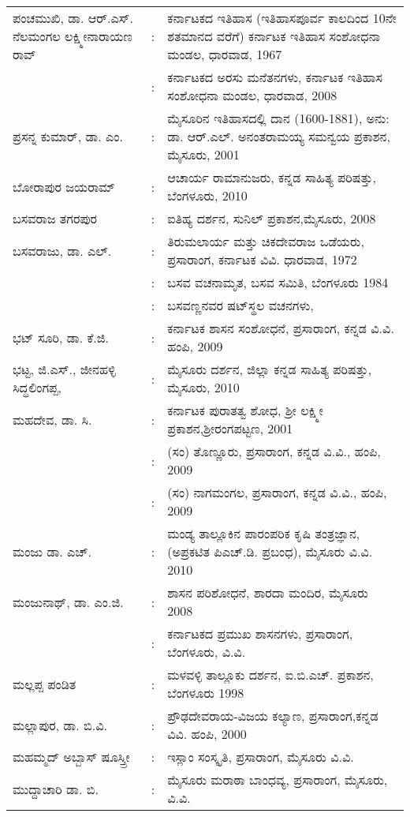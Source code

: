 \begin{longtable}[l]{@{}>{\raggedright}p{4.7cm}cp{9.2cm}<{\raggedright}@{}}
ಪಂಚಮುಖಿ, ಡಾ. ಆರ್​.ಎಸ್​. ನೆಲಮಂಗಲ ಲಕ್ಷ್ಮೀನಾರಾಯಣ ರಾವ್​ & : &  ಕರ್ನಾಟಕದ ಇತಿಹಾಸ (ಇತಿಹಾಸಪೂರ್ವ ಕಾಲದಿಂದ 10ನೇ ಶತಮಾನದ ವರೆಗೆ) ಕರ್ನಾಟಕ ಇತಿಹಾಸ ಸಂಶೋಧನಾ ಮಂಡಲ, ಧಾರವಾಡ, 1967\\[-14pt]
& : & ಕರ್ನಾಟಕದ ಅರಸು ಮನೆತನಗಳು, ಕರ್ನಾಟಕ ಇತಿಹಾಸ ಸಂಶೋಧನಾ ಮಂಡಲ,  ಧಾರವಾಡ, 2008\\
ಪ್ರಸನ್ನ ಕುಮಾರ್​, ಡಾ. ಎಂ. & : &  ಮೈಸೂರಿನ ಇತಿಹಾಸದಲ್ಲಿ ದಾನ (1600-1881), ಅನು: ಡಾ. ಆರ್​.ಎಲ್​. ಅನಂತರಾಮಯ್ಯ ಸಮನ್ವಯ ಪ್ರಕಾಶನ, ಮೈಸೂರು, 2001\\
ಬೋರಾಪುರ ಜಯರಾಮ್ & : &  ಆಚಾರ್ಯ ರಾಮಾನುಜರು, ಕನ್ನಡ ಸಾಹಿತ್ಯ ಪರಿಷತ್ತು, ಬೆಂಗಳೂರು, 2010\\
ಬಸವರಾಜ ತಗರಪುರ & : & ಐತಿಹ್ಯ ದರ್ಶನ, ಸುನಿಲ್​ ಪ್ರಕಾಶನ,ಮೈಸೂರು, 2008\\
ಬಸವರಾಜು, ಡಾ. ಎಲ್​. & : & ತಿರುಮಲಾರ್ಯ ಮತ್ತು ಚಿಕದೇವರಾಜ ಒಡೆಯರು, ಪ್ರಸಾರಾಂಗ, ಕರ್ನಾಟಕ ವಿವಿ. ಧಾರವಾಡ, 1972\\
& : & ಬಸವ ವಚನಾಮೃತ, ಬಸವ ಸಮಿತಿ, ಬೆಂಗಳೂರು 1984\\
& : & ಬಸವಣ್ಣನವರ ಷಟ್​ಸ್ಥಲ ವಚನಗಳು,\\
ಭಟ್​ ಸೂರಿ, ಡಾ. ಕೆ.ಜಿ. & : & ಕರ್ನಾಟಕ ಶಾಸನ ಸಂಶೋಧನೆ, ಪ್ರಸಾರಾಂಗ, ಕನ್ನಡ ವಿ.ವಿ. ಹಂಪಿ, 2009\\
ಭಟ್ಟ, ಜಿ.ಎಸ್​., ಜೀನಹಳ್ಳಿ ಸಿದ್ಧಲಿಂಗಪ್ಪ, & : & ಮೈಸೂರು ದರ್ಶನ, ಜಿಲ್ಲಾ ಕನ್ನಡ ಸಾಹಿತ್ಯ ಪರಿಷತ್ತು, ಮೈಸೂರು, 2010\\
ಮಹದೇವ, ಡಾ. ಸಿ. & : &  ಕರ್ನಾಟಕ ಪುರಾತತ್ವ ಶೋಧ, ಶ‍್ರೀ ಲಕ್ಷ್ಮೀ ಪ್ರಕಾಶನ,\newline ಶ‍್ರೀರಂಗಪಟ್ಟಣ, 2001\\
& : &  (ಸಂ) ತೊಣ್ಣೂರು, ಪ್ರಸಾರಾಂಗ, ಕನ್ನಡ ವಿ.ವಿ., ಹಂಪಿ, 2009\\
& : & (ಸಂ) ನಾಗಮಂಗಲ, ಪ್ರಸಾರಾಂಗ, ಕನ್ನಡ ವಿ.ವಿ., ಹಂಪಿ, 2009\\
ಮಂಜು ಡಾ. ಎಚ್​. & : & ಮಂಡ್ಯ ತಾಲ್ಲೂಕಿನ ಪಾರಂಪರಿಕ ಕೃಷಿ ತಂತ್ರಜ್ಞಾನ,\newline (ಅಪ್ರಕಟಿತ ಪಿಎಚ್​.ಡಿ. ಪ್ರಬಂಧ), ಮೈಸೂರು ವಿ.ವಿ. 2010\\
ಮಂಜುನಾಥ್​, ಡಾ. ಎಂ.ಜಿ. & : &  ಶಾಸನ ಪರಿಶೋಧನೆ, ಶಾರದಾ ಮಂದಿರ, ಮೈಸೂರು 2008\\
& : & ಕರ್ನಾಟಕದ ಪ್ರಮುಖ ಶಾಸನಗಳು, ಪ್ರಸಾರಾಂಗ, ಬೆಂಗಳೂರು, ವಿ.ವಿ.\\
ಮಲ್ಲಪ್ಪ ಪಂಡಿತ & : &  ಮಳವಳ್ಳಿ ತಾಲ್ಲೂಕು ದರ್ಶನ, ಐ.ಬಿ.ಎಚ್​. ಪ್ರಕಾಶನ, ಬೆಂಗಳೂರು 1998\\
ಮಲ್ಲಾಪುರ, ಡಾ. ಬಿ.ವಿ. & : & ಪ್ರೌಢದೇವರಾಯ-ವಿಜಯ ಕಲ್ಯಾಣ, ಪ್ರಸಾರಾಂಗ,\newline ಕನ್ನಡ ವಿವಿ. ಹಂಪಿ, 2000\\
ಮಹಮ್ಮದ್​ ಅಬ್ಬಾಸ್​ ಷೂಸ್ತ್ರೀ & : & ಇಸ್ಲಾಂ ಸಂಸ್ಕೃತಿ, ಪ್ರಸಾರಾಂಗ, ಮೈಸೂರು ವಿ.ವಿ.\\
ಮುದ್ದಾಚಾರಿ ಡಾ. ಬಿ. & : & ಮೈಸೂರು ಮರಾಠಾ ಬಾಂಧವ್ಯ, ಪ್ರಸಾರಾಂಗ, ಮೈಸೂರು, ವಿ.ವಿ. \\

\end{longtable}
